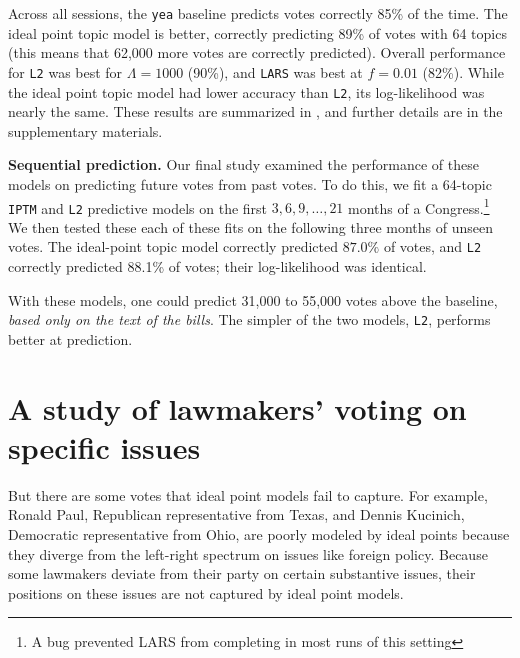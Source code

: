 Across all sessions, the \verb!yea! baseline predicts votes correctly
85\% of the time.  The ideal point topic model is better, correctly
predicting 89\% of votes with 64 topics (this means that 62,000 more
votes are correctly predicted).  Overall performance for \verb!L2! was
best for $\Lambda=1000$ (90\%), and \verb!LARS! was best at $f=0.01$
(82\%).  While the ideal point topic model had lower accuracy than
\verb!L2!, its log-likelihood was nearly the same.  These results are
summarized in , and further details are in the
supplementary materials.

\textbf{Sequential prediction.}  Our final study examined the
performance of these models on predicting future votes from past
votes.  To do this, we fit a 64-topic \verb!IPTM! and \verb!L2!
predictive models on the first $3, 6, 9, \ldots, 21$ months of a
Congress.\footnote{A bug prevented LARS from completing in most runs of
this setting}  We then tested these each of these fits on the
following three months of unseen votes.  The ideal-point topic model
correctly predicted $87.0\%$ of votes, and \verb!L2!  correctly
predicted 88.1\% of votes; their log-likelihood was identical.

With these models, one could predict 31,000 to 55,000 votes
above the baseline, \emph{based only on the text of the bills}.  The
simpler of the two models, \verb!L2!, performs better at prediction.

\section{A study of lawmakers' voting on specific issues}

But there are some votes that ideal point models fail to capture.  For
example, Ronald Paul, Republican representative from Texas, and Dennis
Kucinich, Democratic representative from Ohio, are poorly modeled by
ideal points because they diverge from the left-right spectrum on
issues like foreign policy. Because some lawmakers deviate from their
party on certain substantive issues, their positions on these issues
are not captured by ideal point models.

%


